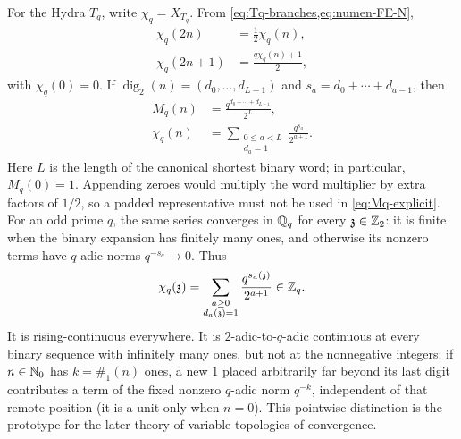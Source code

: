 For the Hydra $T_q$, write $\chi_q=X_{T_q}$.  From
\cref{eq:Tq-branches,eq:numen-FE-N},
\begin{align}
 \chi_q(2n)&=\frac12\chi_q(n),\label{eq:chi-even}\\
 \chi_q(2n+1)&=\frac{q\chi_q(n)+1}{2},\label{eq:chi-odd}
\end{align}
with $\chi_q(0)=0$.  If
$\operatorname{dig}_2(n)=(d_0,\ldots,d_{L-1})$ and
$s_a=d_0+\cdots+d_{a-1}$, then
\begin{align}
 M_q(n)&=\frac{q^{d_0+\cdots+d_{L-1}}}{2^L},
 \label{eq:Mq-explicit}\\
 \chi_q(n)&=\sum_{\substack{0\leq a<L\\d_a=1}}
               \frac{q^{s_a}}{2^{a+1}}.
 \label{eq:chi-explicit}
\end{align}
Here $L$ is the length of the canonical shortest binary word; in particular,
$M_q(0)=1$.  Appending zeroes would multiply the word multiplier by extra
factors of $1/2$, so a padded representative must not be used in
\cref{eq:Mq-explicit}.
For an odd prime $q$, the same series converges in $\mathbb Q_q$ for every
$\mathfrak z\in\mathbb Z_2$: it is finite when the binary expansion has finitely
many ones, and otherwise its nonzero terms have $q$-adic norms
$q^{-s_a}\to0$.  Thus
\begin{equation}
\label{eq:chi-q-adic-series}
 \chi_q(\mathfrak z)=
 \sum_{\substack{a\geq0\\d_a(\mathfrak z)=1}}
 \frac{q^{s_a(\mathfrak z)}}{2^{a+1}}
 \in\mathbb Z_q.
\end{equation}
It is rising-continuous everywhere.  It is $2$-adic-to-$q$-adic continuous
at every binary sequence with infinitely many ones, but not at the
nonnegative integers: if $n\in\mathbb N_0$ has $k=\#_1(n)$ ones, a new $1$ placed
arbitrarily far beyond its last digit contributes a term of the fixed
nonzero $q$-adic norm $q^{-k}$, independent of that remote position (it is a
unit only when $n=0$).  This pointwise distinction is the prototype for the
later theory of variable topologies of convergence.

